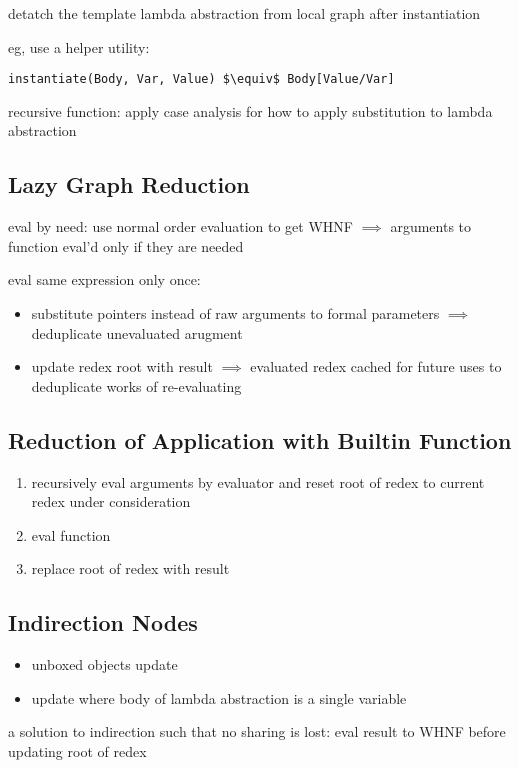 \documentclass[8pt]{extarticle}
\begin{document}
\begin{multicols*}{2}
detatch the template lambda abstraction from local graph after instantiation

eg, use a helper utility:
\begin{lstlisting}
instantiate(Body, Var, Value) $\equiv$ Body[Value/Var]
\end{lstlisting}

recursive function: apply case analysis for how to apply substitution to lambda abstraction

\subsection{Lazy Graph Reduction}
eval by need: use normal order evaluation to get WHNF $\implies$ arguments to function eval'd only if they are needed

eval same expression only once:
\begin{itemize}
\item substitute pointers instead of raw arguments to formal parameters $\implies$ deduplicate unevaluated arugment
\item update redex root with result $\implies$ evaluated redex cached for future uses to deduplicate works of re-evaluating
\end{itemize}

\subsection{Reduction of Application with Builtin Function}
\begin{enumerate}
\item recursively eval arguments by evaluator and reset root of redex to current redex under consideration
\item eval function
\item replace root of redex with result
\end{enumerate}

\subsection{Indirection Nodes}

\begin{itemize}
\item unboxed objects update
\item update where body of lambda abstraction is a single variable
\end{itemize}

a solution to indirection such that no sharing is lost: eval result to WHNF before updating root of redex


\end{multicols*}
\end{document}
